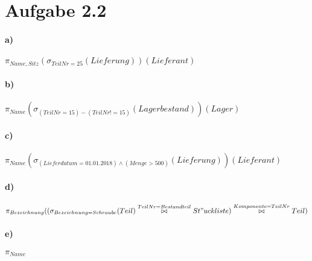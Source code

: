 \documentclass[12pt]{article}
\begin{document}
 	\section*{Aufgabe 2.2}
 	
 	\paragraph*{a)}
 	$\pi_{Name, Sitz}(\sigma_{TeilNr=25}(Lieferung))(Lieferant)$
 	
 	\paragraph*{b)}
 	$\pi_{Name}(\sigma_{(TeilNr=15) - (TeilNr != 15)}(Lagerbestand))(Lager)$
 	
 	
 	\paragraph*{c)}
 	$\pi_{Name}(\sigma_{(Lieferdatum = 01.01.2018) \wedge (Menge > 500)}(Lieferung))(Lieferant)$
 	
 	
 	\paragraph*{d)}
 	$\pi_{Bezeichnung}(\large(\sigma_{Bezeichnung=Schraube}(Teil) \overset{TeilNr = Bestandteil}{\bowtie} St"uckliste\large) \overset{Komponente = TeilNr}{\bowtie} Teil)$
 	
 	\paragraph*{e)}
 	$\pi_{Name}$
 
\end{document}
